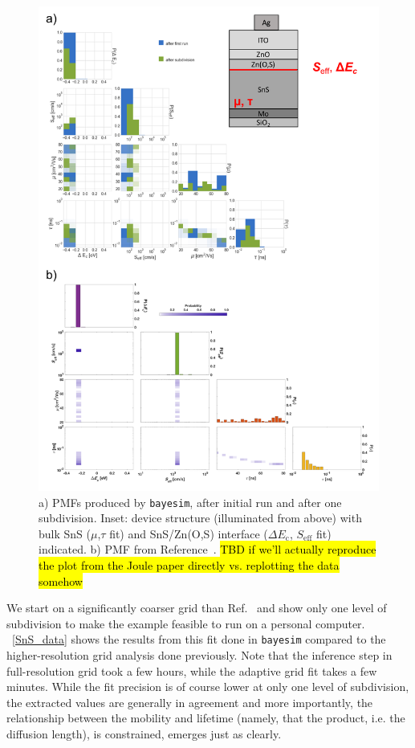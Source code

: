 \documentclass[aps,prl,amsmath,amssymb,superscriptaddress,notitlepage,groupedaddress]{revtex4-1}
\begin{document}
    \begin{figure}
      \includegraphics[width=0.8\columnwidth]{figure_4.png}
      \caption{a) PMFs produced by \texttt{bayesim}, after initial run and after one subdivision. Inset: device structure (illuminated from above) with bulk SnS ($\mu$,$\tau$ fit) and SnS/Zn(O,S) interface ($\Delta E_\text{c}$, $S_{\text{eff}}$ fit) indicated. b) PMF from Reference~\cite{SnSJoule}. \hl{TBD if we'll actually reproduce the plot from the Joule paper directly vs. replotting the data somehow}}
      \label{SnS_data}
    \end{figure}

    We start on a significantly coarser grid than Ref.~\cite{SnSJoule} and show only one level of subdivision to make the example feasible to run on a personal computer. ~\autoref{SnS_data} shows the results from this fit done in \texttt{bayesim} compared to the higher-resolution grid analysis done previously. Note that the inference step in full-resolution grid took a few hours, while the adaptive grid fit takes a few minutes. While the fit precision is of course lower at only one level of subdivision, the extracted values are generally in agreement and more importantly, the relationship between the mobility and lifetime (namely, that the product, i.e. the diffusion length), is constrained, emerges just as clearly.
\end{document}
